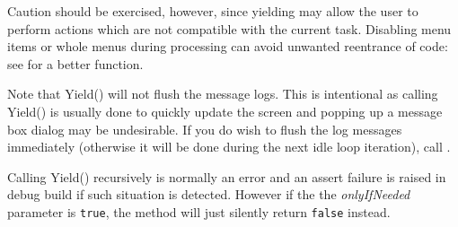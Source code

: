 Caution should be exercised, however, since yielding may allow the
user to perform actions which are not compatible with the current task.
Disabling menu items or whole menus during processing can avoid unwanted
reentrance of code: see  for a better
function.

Note that Yield() will not flush the message logs. This is intentional as
calling Yield() is usually done to quickly update the screen and popping up a
message box dialog may be undesirable. If you do wish to flush the log
messages immediately (otherwise it will be done during the next idle loop
iteration), call .

Calling Yield() recursively is normally an error and an assert failure is
raised in debug build if such situation is detected. However if the the 
{\it onlyIfNeeded} parameter is {\tt true}, the method will just silently
return {\tt false} instead.

